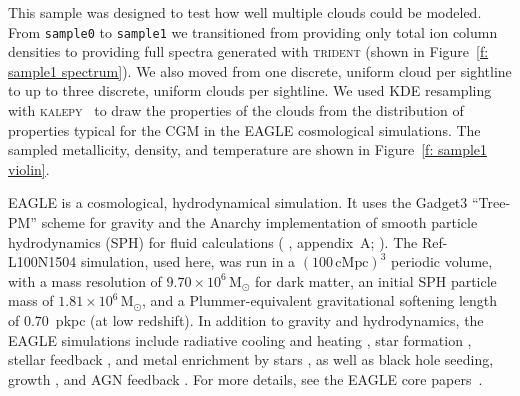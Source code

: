 \documentclass[fleqn,usenatbib]{mnras}
\begin{document}
This sample was designed to test how well multiple clouds could be modeled.
From \texttt{sample0} to \texttt{sample1} we transitioned from providing only total ion column densities to providing full spectra generated with \textsc{trident} (shown in Figure~\ref{f: sample1 spectrum}).
We also moved from one discrete, uniform cloud per sightline to up to three discrete, uniform clouds per sightline.
We used KDE resampling with \textsc{kalepy}~\citep{kelley2021Kalepy} to draw the properties of the clouds from the distribution of properties typical for the CGM in the \textsc{EAGLE} cosmological simulations.
The sampled metallicity, density, and temperature are shown in Figure~\ref{f: sample1 violin}.

EAGLE \citep[`Evolution and Assembly of GaLaxies and their Environments';][]{schaye2015EAGLE,Crain2015,McAlpine2016} is a cosmological, hydrodynamical simulation.
It uses the Gadget3 ``Tree-PM'' scheme for gravity \citep[][]{springel2005Cosmological} and the Anarchy implementation of smooth particle hydrodynamics (SPH) for fluid calculations (\citeauthor{schaye2015EAGLE} \citeyear{schaye2015EAGLE}, appendix~A; \citeauthor{Schaller2015} \citeyear{Schaller2015}).
The Ref-L100N1504 simulation, used here, was run in a $(100\,\mathrm{cMpc})^3$ periodic volume, with a mass resolution of $9.70 \times 10^6 \,\mathrm{M}_{\odot}$ for dark matter, an initial SPH particle mass of $1.81 \times 10^6 \,\mathrm{M}_{\odot}$, and a Plummer-equivalent gravitational softening length of $0.70$~pkpc (at low redshift).
In addition to gravity and hydrodynamics, the EAGLE simulations include radiative cooling and heating \citep{wiersma2009Effect}, star formation \citep{Schaye2004, Schaye2008}, stellar feedback \citep{DallaVecchia2012}, and metal enrichment by stars \citep{wiersma2009Chemical}, as well as black hole seeding, growth \citep{Rosas-Guevara2015}, and AGN feedback \citep{Booth2009}.
For more details, see the EAGLE core papers~\citep{schaye2015EAGLE,Crain2015,McAlpine2016}.
\end{document}
